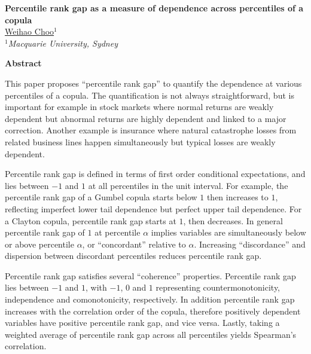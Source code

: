
\setlength{\parindent}{0ex}
\setlength{\parskip}{2.5ex}
\setlength{\textwidth}{14.8cm}
\pagestyle{empty}


\begin{center}
{\large\bf Percentile rank gap as a measure of dependence across percentiles of a copula}\\

\vspace{0.5cm}
\underline{Weihao Choo$^1$}\\

\vspace{0.5cm}
{\it  $^1$Macquarie University, Sydney}
\end{center}

\hrulefill

{\bf Abstract}

This paper proposes ``percentile rank gap'' to quantify the dependence at various percentiles of a copula. The quantification is not always straightforward, but is important for example in stock markets where normal returns are weakly dependent but abnormal returns are highly dependent and linked to a major correction. Another example is insurance where natural catastrophe losses from related business lines happen simultaneously but typical losses are weakly dependent.

Percentile rank gap is defined in terms of first order conditional expectations, and lies between $-1$ and $1$ at all percentiles in the unit interval. For example, the percentile rank gap of a Gumbel copula starts below $1$ then increases to $1$, reflecting imperfect lower tail dependence but perfect upper tail dependence. For a Clayton copula, percentile rank gap starts at $1$, then decreases. In general percentile rank gap of $1$ at percentile $\alpha$ implies variables are simultaneously below or above percentile $\alpha$, or ``concordant'' relative to $\alpha$. Increasing ``discordance'' and dispersion between discordant percentiles reduces percentile rank gap.

Percentile rank gap satisfies several ``coherence'' properties. Percentile rank gap lies between $-1$ and $1$, with $-1$, $0$ and $1$ representing countermonotonicity, independence and comonotonicity, respectively. In addition percentile rank gap increases with the correlation order of the copula, therefore positively dependent variables have positive percentile rank gap, and vice versa. Lastly, taking a weighted average of percentile rank gap across all percentiles yields Spearman's correlation.

